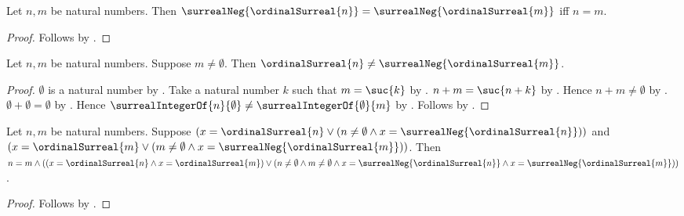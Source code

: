 \begin{theorem}\label{surreal_integer_negative_normal_form_injective}
    Let $n,m$ be natural numbers.
    Then
        $\surrealNeg{\ordinalSurreal{n}}
            =\surrealNeg{\ordinalSurreal{m}}$ iff $n=m$.
\end{theorem}
\begin{proof}
    Follows by
        .
\end{proof}

\begin{theorem}\label{surreal_integer_normal_form_signs_disjoint}
    Let $n,m$ be natural numbers.
    Suppose $m\neq\emptyset$.
    Then $\ordinalSurreal{n}
        \neq\surrealNeg{\ordinalSurreal{m}}$.
\end{theorem}
\begin{proof}
    $\emptyset$ is a natural number by .
    Take a natural number $k$ such that $m=\suc{k}$
        by .
    $n+m=\suc{n+k}$
        by .
    Hence $n+m\neq\emptyset$ by .
    $\emptyset+\emptyset=\emptyset$
        by .
    Hence $\surrealIntegerOf{n}{\emptyset}
        \neq\surrealIntegerOf{\emptyset}{m}$
        by .
    Follows by
        .
\end{proof}

\begin{theorem}\label{surreal_integer_canonical_normal_form_unique}
    Let $n,m$ be natural numbers.
    Suppose
        $(x=\ordinalSurreal{n}
          \lor (n\neq\emptyset\land
            x=\surrealNeg{\ordinalSurreal{n}}))$
        and
        $(x=\ordinalSurreal{m}
          \lor (m\neq\emptyset\land
            x=\surrealNeg{\ordinalSurreal{m}}))$.
    Then
        $n=m\land
        ((x=\ordinalSurreal{n}\land x=\ordinalSurreal{m})
         \lor
         (n\neq\emptyset\land m\neq\emptyset\land
          x=\surrealNeg{\ordinalSurreal{n}}\land
          x=\surrealNeg{\ordinalSurreal{m}}))$.
\end{theorem}
\begin{proof}
    Follows by
        .
\end{proof}

